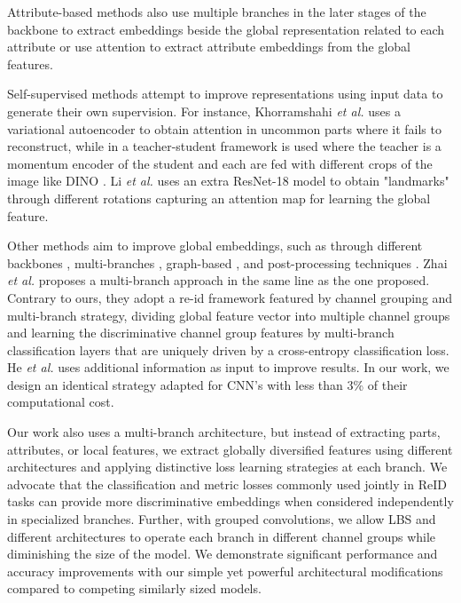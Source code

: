 \documentclass[letterpaper, 10pt, conference]{ieeeconf}
\begin{document}
Attribute-based methods \cite{quispe2021attributenet, sun2020CFVMNet, article} also use multiple branches in the later stages of the backbone to extract embeddings beside the global representation related to each attribute or use attention to extract attribute embeddings from the global features. 

Self-supervised methods attempt to improve representations using input data to generate their own supervision. For instance, Khorramshahi \textit{et al.} \cite{khorramshahi2020devil} uses a variational autoencoder to obtain attention in uncommon parts where it fails to reconstruct, while in \cite{khorramshahi2022scalable} a teacher-student framework is used where the teacher is a momentum encoder of the student and each are fed with different crops of the image like DINO \cite{caron2021emerging}. Li \textit{et al.} \cite{li2021self} uses an extra ResNet-18 model to obtain "landmarks" through different rotations capturing an attention map for learning the global feature.

Other methods aim to improve global embeddings, such as through different backbones \cite{he2021transreid}, multi-branches \cite{sun2020CFVMNet, meng2020parsing, quispe2021attributenet, article, lee2022multiple}, graph-based \cite{zhao2021heterogeneous}, and post-processing techniques \cite{zhong2017re}. 
Zhai \textit{et al.} \cite{Zhai_2019_CVPR_Workshops} proposes a multi-branch approach in the same line as the one proposed. Contrary to ours, they adopt a re-id framework featured by channel grouping and multi-branch strategy, dividing global feature vector into multiple channel groups and learning the discriminative channel group features by multi-branch classification layers that are uniquely driven by a cross-entropy classification loss.
He \textit{et al.} \cite{he2021transreid} uses additional information as input to improve results. In our work, we design an identical strategy adapted for CNN's with less than 3\% of their computational cost.

Our work also uses a multi-branch architecture, but instead of extracting parts, attributes, or local features, we extract globally diversified features using different architectures and applying distinctive loss learning strategies at each branch.
We advocate that the classification and metric losses commonly used jointly in ReID tasks can provide more discriminative embeddings when considered independently in specialized branches. Further, with grouped convolutions, we allow LBS and different architectures to operate each branch in different channel groups while diminishing the size of the model.
We demonstrate significant performance and accuracy improvements with our simple yet powerful architectural modifications compared to competing similarly sized models.
\end{document}
